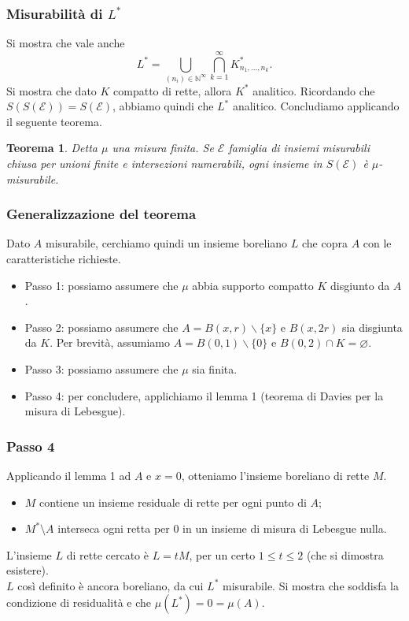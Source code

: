 \documentclass[11pt]{beamer} %
\newcommand{\N}{\mathbb{N}}
\newcommand{\E}{\mathcal{E}}
\newcommand{\<}{\langle}
\renewcommand{\>}{\rangle}
\theoremstyle{theorem}
\newtheorem{teo}{Teorema}
\theoremstyle{theorem}
\theoremstyle{theorem}
\theoremstyle{theorem}
\theoremstyle{theorem}
\begin{document}
\begin{frame}
\frametitle{Misurabilità di $L^*$}	
Si mostra che vale anche
$$L^*=\bigcup_{{ (n_i)}\in{\N}^\infty}\bigcap_{k=1}^\infty K_{n_1,\ldots,n_k}^*.$$ 
\pause
Si mostra che dato $K$ compatto di rette, allora $K^*$ analitico. \pause
Ricordando che $S(S(\E))=S(\E)$, abbiamo quindi che $L^*$ analitico. \pause Concludiamo applicando il seguente teorema. \\
\pause
\begin{teo}
 	Detta $\mu$ una misura finita. Se $\E$ famiglia di insiemi misurabili chiusa per unioni finite e intersezioni numerabili, ogni insieme in $S(\E)$ è $\mu$-misurabile.
\end{teo}	
	
	
\end{frame}


\begin{frame}[fragile]

\frametitle{Generalizzazione del teorema}
Dato $A$ misurabile, cerchiamo quindi un insieme boreliano $L$ che copra $A$ con le caratteristiche richieste. \\ \pause
\medskip
{}
	\begin{itemize}
		\item Passo 1: possiamo assumere che $\mu$ abbia supporto compatto $K$ disgiunto da $A$.\\ \pause
		\item Passo 2: possiamo assumere che $A=B(x, r) \backslash\{x\}$ e $B(x, 2 r)$ sia disgiunta da $K$. Per brevità, assumiamo $A=B(0,1) \backslash\{0\}$ e $B(0,2) \cap K=\varnothing$. \pause
		\item Passo 3: possiamo assumere che $\mu$ sia finita. \pause
		\item Passo 4: per concludere, applichiamo il lemma 1 (teorema di Davies per la misura di Lebesgue).
	\end{itemize}
\end{frame}


\begin{frame}
\frametitle{Passo 4}
Applicando il lemma 1 ad $A$ e $x=0$, otteniamo l'insieme boreliano di rette $M$. \pause \\
\begin{itemize}
	\item $M$ contiene un insieme residuale di rette per ogni punto di $A$;\\
	\item $M^*\setminus A$ interseca ogni retta per $0$ in un insieme di misura di Lebesgue nulla.
\end{itemize} \pause
	L'insieme $L$ di rette cercato è $L=tM$, per un certo $1 \leq t \leq 2$ (che si dimostra esistere). \\ \pause
	$L$ così definito è ancora boreliano, da cui $L^*$ misurabile. Si mostra che soddisfa la condizione di residualità e che $\mu (L^*)= 0= \mu(A)$.
\end{frame}
\end{document}
